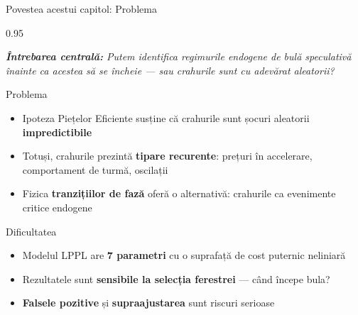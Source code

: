 \documentclass[9pt, aspectratio=169, t]{beamer}
\begin{document}
\begin{frame}{Povestea acestui capitol: Problema}
    \begin{cminipage}{0.95\textwidth}
    {\footnotesize
    \textit{\textbf{Întrebarea centrală:} Putem identifica regimurile endogene de bulă speculativă înainte ca acestea să se încheie --- sau crahurile sunt cu adevărat aleatorii?}
    \vspace{0.2cm}
    \begin{block}{Problema}
        \begin{itemize}\setlength{\itemsep}{2pt}
            \item Ipoteza Piețelor Eficiente susține că crahurile sunt șocuri aleatorii \textbf{impredictibile}
            \item Totuși, crahurile prezintă \textbf{tipare recurente}: prețuri în accelerare, comportament de turmă, oscilații
            \item Fizica \textbf{tranzițiilor de fază} oferă o alternativă: crahurile ca evenimente critice endogene
        \end{itemize}
    \end{block}
    \vspace{0.1cm}
    \begin{alertblock}{Dificultatea}
        \begin{itemize}\setlength{\itemsep}{2pt}
            \item Modelul LPPL are \textbf{7 parametri} cu o suprafață de cost puternic neliniară
            \item Rezultatele sunt \textbf{sensibile la selecția ferestrei} --- când începe bula?
            \item \textbf{Falsele pozitive} și \textbf{supraajustarea} sunt riscuri serioase
        \end{itemize}
    \end{alertblock}
    }
    \end{cminipage}
\end{frame}
\end{document}
